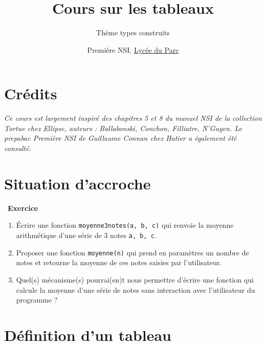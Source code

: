 \documentclass[
  11pt,
]{article}
\title{Cours sur les tableaux}
\subtitle{Thème types construits}
\author{Première NSI, \href{https://frederic-junier.org/}{Lycée du
Parc}}
\date{}
\newcommand{\passthrough}[1]{#1}
\providecommand{\tightlist}{%
  \setlength{\itemsep}{0pt}\setlength{\parskip}{0pt}}
\newcounter{exo}
\newenvironment{exercice}[1]
{\par \medskip   \addtocounter{exo}{1} \noindent  
\begin{bclogo}[arrondi =0.1,   noborder = true, logo=\bccrayon, marge=4]{~\textbf{Exercice} \textbf{\theexo} {\itshape #1} }  \par}
{
\end{bclogo}
 \par \bigskip }
\newcounter{def}
\newcounter{cours}
\newcounter{prog}
\begin{document}
\maketitle

\renewcommand*\contentsname{Table des matières}
{
\hypersetup{linkcolor=}
\setcounter{tocdepth}{3}
\tableofcontents
}
\hypertarget{cruxe9dits}{%
\section*{Crédits}\label{cruxe9dits}}

\emph{Ce cours est largement inspiré des chapitres 5 et 8 du manuel NSI
de la collection Tortue chez Ellipse, auteurs : Ballabonski, Conchon,
Filliatre, N'Guyen. Le prepabac Première NSI de Guillaume Connan chez
Hatier a également été consulté.}

\hypertarget{situation-daccroche}{%
\section{Situation d'accroche}\label{situation-daccroche}}

\begin{exercice}{}

\begin{enumerate}
\def\labelenumi{\arabic{enumi}.}
\tightlist
\item
  Écrire une fonction \passthrough{\lstinline!moyenne3notes(a, b, c)!}
  qui renvoie la moyenne arithmétique d'une série de 3 notes
  \passthrough{\lstinline!a, b, c!}.
\item
  Proposer une fonction \passthrough{\lstinline!moyenne(n)!} qui prend
  en paramètres un nombre de notes et retourne la moyenne de ces notes
  saisies par l'utilisateur.
\item
  Quel(s) mécanisme(s) pourrai(en)t nous permettre d'écrire une fonction
  qui calcule la moyenne d'une série de notes sans interaction avec
  l'utilisateur du programme ?
\end{enumerate}

\end{exercice}

\hypertarget{duxe9finition-dun-tableau}{%
\section{Définition d'un tableau}\label{duxe9finition-dun-tableau}}
\end{document}
